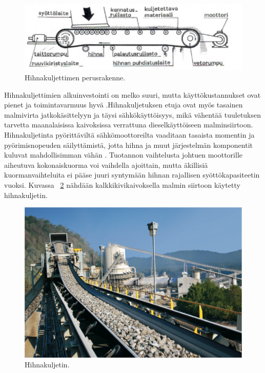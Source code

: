 \documentclass[finnish,12pt,a4paper,pdftex,elec,utf8]{aaltothesis}
\begin{document}
\begin{figure}[H]
	\begin{center}
	\includegraphics[scale=0.75]{hihnakuljetin_rakenne}
	\end{center}
	\caption{Hihnakuljettimen perusrakenne.
		\cite{Ruokolainen}}
	\label{fig:hihnakuljetin_rakenne}
\end{figure}

\noindent
Hihnakuljettimien alkuinvestointi on melko suuri, mutta käyttökustannukset ovat pienet ja toimintavarmuus hyvä \cite{Hakapää}.Hihnakuljetuksen etuja ovat myös tasainen malmivirta jatkokäsittelyyn ja täysi sähkökäyttöisyys, mikä vähentää tuuletuksen tarvetta maanalaisissa kaivoksissa verrattuna dieselkäyttöiseen malminsiirtoon. Hihnakuljetinta pyörittäviltä sähkömoottoreilta vaaditaan tasaista momentin ja pyörimisnopeuden säilyttämistä, jotta hihna ja muut järjestelmän komponentit kuluvat mahdollisimman vähän \cite{MyyntiHaastattelu}. Tuotannon vaihtelusta johtuen moottorille aiheutuva kokonaiskuorma voi vaihdella ajoittain, mutta äkillisiä kuormanvaihteluita ei pääse juuri syntymään hihnan rajallisen syöttökapasiteetin vuoksi. Kuvassa ~\ref{fig:conveyor} nähdään kalkkikivikaivoksella malmin siirtoon käytetty hihnakuljetin.

\begin{figure}[H]
	\begin{center}
	\includegraphics[scale=0.6]{conveyor}
	\end{center}
	\caption{Hihnakuljetin.
		\cite{conveyor}}
	\label{fig:conveyor}
\end{figure}
\end{document}
